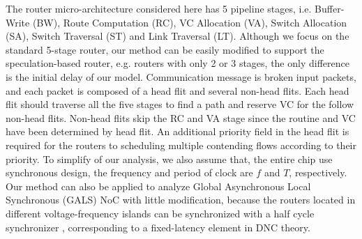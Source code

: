 \documentclass[10pt,journal]{IEEEtran}
\begin{document}
The router micro-architecture considered here has 5 pipeline stages, i.e. Buffer-Write (BW), Route Computation (RC), VC Allocation (VA), Switch Allocation (SA), Switch Traversal (ST) and Link Traversal (LT). Although we focus on the standard 5-stage router, our method can be easily modified to support the speculation-based router, e.g. routers with only 2 or 3 stages, the only difference is the initial delay of our model. Communication message is broken input packets, and each packet is composed of a head flit and several non-head flits. Each head flit should traverse all the five stages to find a path and reserve VC for the follow non-head flits. Non-head flits skip the RC and VA stage since the routine and VC have been determined by head flit. An additional priority field in the head flit is required for the routers to scheduling multiple contending flows according to their priority. To simplify of our analysis, we also assume that, the entire chip use synchronous design, the frequency and period of clock are $f$ and $T$, respectively. Our method can also be applied to analyze Global Asynchronous Local Synchronous (GALS) NoC with little modification, because the routers located in different voltage-frequency islands can be synchronized with a half cycle synchronizer \cite{5476986}, corresponding to a fixed-latency element in DNC theory.
\end{document}
